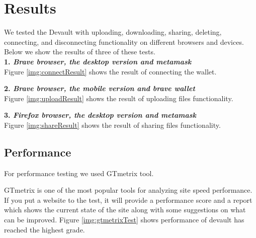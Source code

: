 \section{Results}


We tested the Devault with uploading, downloading, sharing, deleting, connecting, and disconnecting functionality on different browsers and devices. Below we show the results of three of these tests. \\

\noindent
\textbf{1. \textit{Brave browser, the desktop version and metamask}} \\

Figure \ref{img:connectResult} shows the result of connecting the wallet.



\newpage
\noindent
\textbf{2. \textit{Brave browser, the mobile version and brave wallet}} \\

Figure \ref{img:uploadResult} shows the result of uploading files functionality.



\newpage
\noindent
\textbf{3. \textit{Firefox browser, the desktop version and metamask}} \\

Figure \ref{img:shareResult} shows the result of sharing files functionality.



\newpage
\subsection{Performance}

For performance testing we used GTmetrix tool.

GTmetrix is one of the most popular tools for analyzing site speed performance. If you put a website to the test, it will provide a performance score and a report which shows the current state of the site along with some suggestions on what can be improved.
Figure \ref{img:gtmetrixTest} shows performance of devault has reached the highest grade.

